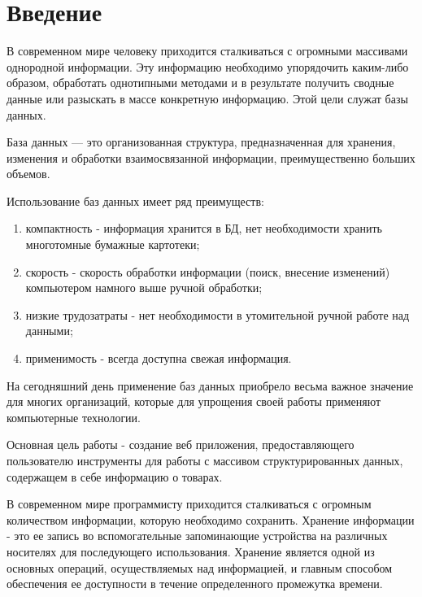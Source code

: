 \newpage

\section*{Введение} %
{} %

В современном мире человеку приходится сталкиваться с огромными массивами однородной информации.
Эту информацию необходимо упорядочить каким-либо образом, обработать однотипными методами
и в результате получить сводные данные или разыскать в массе конкретную информацию.
Этой цели служат базы данных.

База данных — это организованная структура, предназначенная для хранения,
изменения и обработки взаимосвязанной информации, преимущественно больших объемов.

Использование баз данных имеет ряд преимуществ:

\begin{enumerate}
    \item компактность - информация хранится в БД, нет необходимости хранить
    многотомные бумажные картотеки;
    \item скорость - скорость обработки информации (поиск, внесение изменений)
    компьютером намного выше ручной обработки;
    \item низкие трудозатраты - нет необходимости в утомительной ручной работе над данными;
    \item применимость - всегда доступна свежая информация.
\end{enumerate}

На сегодняшний день применение баз данных приобрело весьма важное значение для многих организаций,
которые для упрощения своей работы применяют компьютерные технологии.

Основная цель работы - создание веб приложения, предоставляющего пользователю инструменты для работы
с массивом структурированных данных, содержащем в себе информацию о товарах.

В современном мире программисту приходится сталкиваться с огромным количеством информации,
которую необходимо сохранить.
Хранение информации - это ее запись во вспомогательные запоминающие устройства на различных носителях
для последующего использования.
Хранение является одной из основных операций, осуществляемых над информацией,
и главным способом обеспечения ее доступности в течение определенного промежутка времени.

